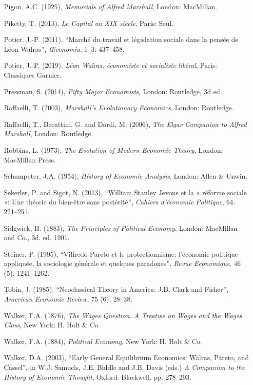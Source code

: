 \documentclass[12pt]{article}
\begin{document}
\begin{description}
    \item Pigou, A.C. (1925), \textit{Memorials of Alfred Marshall}, London: MacMillan.
    \item Piketty, T. (2013), \textit{Le Capital au XIX siècle}, Paris: Seul.
    \item Potier, J.-P. (2011), “Marché du travail et législation sociale dans la pensée de Léon Walras”, \textit{Œconomia}, 1–3: 437–458.
    \item Potier, J.-P. (2019), \textit{Léon Walras, économiste et socialiste libéral}, Paris: Classiques Garnier.
    \item Pressman, S. (2014), \textit{Fifty Major Economists}, London: Routledge, 3d ed.
    \item Raffaelli, T. (2003), \textit{Marshall’s Evolutionary Economics}, London: Routledge.
    \item Raffaelli, T., Becattini, G. and Dardi, M. (2006), \textit{The Elgar Companion to Alfred Marshall}, London: Routledge.
    \item Robbins, L. (1973), \textit{The Evolution of Modern Economic Theory}, London: MacMillan Press.
    \item Schumpeter, J.A. (1954), \textit{History of Economic Analysis}, London: Allen \& Unwin.
    \item Sekerler, P. and Sigot, N. (2013), “William Stanley Jevons et la « réforme sociale »: Une théorie du bien-être sans postérité”, \textit{Cahiers d’économie Politique}, 64: 221–251.
    \item Sidgwick, H. (1883), \textit{The Principles of Political Economy}, London: MacMillan and Co., 3d. ed. 1901.
    \item Steiner, P. (1995), “Vilfredo Pareto et le protectionnisme: l’économie politique appliquée, la sociologie générale et quelques paradoxes”, \textit{Revue Economique}, 46 (5): 1241–1262.
    \item Tobin, J. (1985), “Neoclassical Theory in America: J.B. Clark and Fisher”, \textit{American Economic Review}, 75 (6): 28–38.
    \item Walker, F.A. (1876), \textit{The Wages Question. A Treatise on Wages and the Wages Class}, New York: H. Holt \& Co.
    \item Walker, F.A. (1884), \textit{Political Economy}, New York: H. Holt \& Co.
    \item Walker, D.A. (2003), “Early General Equilibrium Economics: Walras, Pareto, and Cassel”, in W.J. Samuels, J.E. Biddle and J.B. Davis (eds.) \textit{A Companion to the History of Economic Thought}, Oxford: Blackwell, pp. 278–293.

\end{description}
\end{document}
